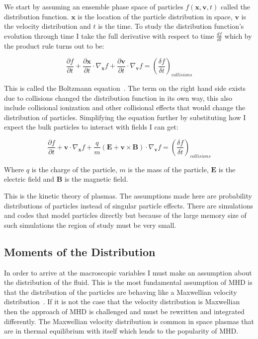\documentclass[12pt,upcase]{umlthesis}
\begin{document}
We start by assuming an ensemble phase space of particles $f(\textbf{x}, \textbf{v}, t)$ called the distribution function. $\textbf{x}$ is the location of the particle distribution in space, $\textbf{v}$ is the velocity distribution and $t$ is the time. To study the distribution function's evolution through time I take the full derivative with respect to time $\frac{df}{dt}$ which by the product rule turns out to be:

\begin{equation}
	\frac{\partial f}{\partial t} + \frac{\partial \textbf{x}}{\partial t} \cdot \nabla_{\textbf{x}} f + \frac{\partial \textbf{v}}{\partial t} \cdot \nabla_{\textbf{v}} f = {(\frac{\delta f}{\delta t})}_{collisions}
\end{equation}

This is called the Boltzmann equation~\citep{lerner2005}. The term on the right hand side exists due to collisions changed the distribution function in its own way, this also include collisional ionization and other collisional effects that would change the distribution of particles. Simplifying the equation further by substituting how I expect the bulk particles to interact with fields I can get:
 
\begin{equation}
	\frac{\partial f}{\partial t} + \textbf{v} \cdot \nabla_{\textbf{x}} f + \frac{q}{m} (\textbf{E} + \textbf{v} \times \textbf{B}) \cdot \nabla_{\textbf{v}} f = {(\frac{\delta f}{\delta t})}_{collisions}
\end{equation}

Where $q$ is the charge of the particle, $m$ is the mass of the particle, $\textbf{E}$ is the electric field and $\textbf{B}$ is the magnetic field.

This is the kinetic theory of plasmas. The assumptions made here are probability distributions of particles instead of singular particle effects. There are simulations and codes that model particles directly but because of the large memory size of such simulations the region of study must be very small. 

\subsection{Moments of the Distribution}\label{sec:moments}

	In order to arrive at the macroscopic variables I must make an assumption about the distribution of the fluid. This is the most fundamental assumption of MHD is that the distribution of the particles are behaving like a Maxwellian velocity distribution~\citep{mandl1988}. If it is not the case that the velocity distribution is Maxwellian then the approach of MHD is challenged and must be rewritten and integrated differently. The Maxwellian velocity distribution is common in space plasmas that are in thermal equilibrium with itself which lends to the popularity of MHD\@.
\end{document}

